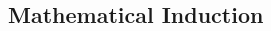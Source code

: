 \documentclass[8pt,landscape]{article}
\begin{document}
\begin{multicols}{3}



    \subsection{Mathematical Induction}








\end{multicols}
\end{document}
